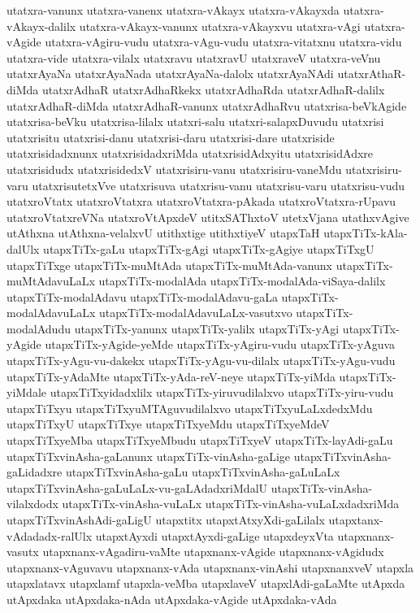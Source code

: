 {utatxra-vanunx
utatxra-vanenx
utatxra-vAkayx
utatxra-vAkayxda
utatxra-vAkayx-dalilx
utatxra-vAkayx-vanunx
utatxra-vAkayxvu
utatxra-vAgi
utatxra-vAgide
utatxra-vAgiru-vudu
utatxra-vAgu-vudu
utatxra-vitatxnu
utatxra-vidu
utatxra-vide
utatxra-vilalx
utatxravu
utatxravU
utatxraveV
utatxra-veVnu
utatxrAyaNa
utatxrAyaNada
utatxrAyaNa-dalolx
utatxrAyaNAdi
utatxrAthaR-diMda
utatxrAdhaR
utatxrAdhaRkekx
utatxrAdhaRda
utatxrAdhaR-dalilx
utatxrAdhaR-diMda
utatxrAdhaR-vanunx
utatxrAdhaRvu
utatxrisa-beVkAgide
utatxrisa-beVku
utatxrisa-lilalx
utatxri-salu
utatxri-salapxDuvudu
utatxrisi
utatxrisitu
utatxrisi-danu
utatxrisi-daru
utatxrisi-dare
utatxriside
utatxrisidadxnunx
utatxrisidadxriMda
utatxrisidAdxyitu
utatxrisidAdxre
utatxrisidudx
utatxrisidedxV
utatxrisiru-vanu
utatxrisiru-vaneMdu
utatxrisiru-varu
utatxrisutetxVve
utatxrisuva
utatxrisu-vanu
utatxrisu-varu
utatxrisu-vudu
utatxroVtatx
utatxroVtatxra
utatxroVtatxra-pAkada
utatxroVtatxra-rUpavu
utatxroVtatxreVNa
utatxroVtApxdeV
utitxSAThxtoV
utetxVjana
utathxvAgive
utAthxna
utAthxna-velalxvU
utithxtige
utithxtiyeV
utapxTaH
utapxTiTx-kAla-dalUlx
utapxTiTx-gaLu
utapxTiTx-gAgi
utapxTiTx-gAgiye
utapxTiTxgU
utapxTiTxge
utapxTiTx-muMtAda
utapxTiTx-muMtAda-vanunx
utapxTiTx-muMtAdavuLaLx
utapxTiTx-modalAda
utapxTiTx-modalAda-viSaya-dalilx
utapxTiTx-modalAdavu
utapxTiTx-modalAdavu-gaLa
utapxTiTx-modalAdavuLaLx
utapxTiTx-modalAdavuLaLx-vasutxvo
utapxTiTx-modalAdudu
utapxTiTx-yanunx
utapxTiTx-yalilx
utapxTiTx-yAgi
utapxTiTx-yAgide
utapxTiTx-yAgide-yeMde
utapxTiTx-yAgiru-vudu
utapxTiTx-yAguva
utapxTiTx-yAgu-vu-dakekx
utapxTiTx-yAgu-vu-dilalx
utapxTiTx-yAgu-vudu
utapxTiTx-yAdaMte
utapxTiTx-yAda-reV-neye
utapxTiTx-yiMda
utapxTiTx-yiMdale
utapxTiTxyidadxlilx
utapxTiTx-yiruvudilalxvo
utapxTiTx-yiru-vudu
utapxTiTxyu
utapxTiTxyuMTAguvudilalxvo
utapxTiTxyuLaLxdedxMdu
utapxTiTxyU
utapxTiTxye
utapxTiTxyeMdu
utapxTiTxyeMdeV
utapxTiTxyeMba
utapxTiTxyeMbudu
utapxTiTxyeV
utapxTiTx-layAdi-gaLu
utapxTiTxvinAsha-gaLanunx
utapxTiTx-vinAsha-gaLige
utapxTiTxvinAsha-gaLidadxre
utapxTiTxvinAsha-gaLu
utapxTiTxvinAsha-gaLuLaLx
utapxTiTxvinAsha-gaLuLaLx-vu-gaLAdadxriMdalU
utapxTiTx-vinAsha-vilalxdodx
utapxTiTx-vinAsha-vuLaLx
utapxTiTx-vinAsha-vuLaLxdadxriMda
utapxTiTxvinAshAdi-gaLigU
utapxtitx
utapxtAtxyXdi-gaLilalx
utapxtanx-vAdadadx-ralUlx
utapxtAyxdi
utapxtAyxdi-gaLige
utapxdeyxVta
utapxnanx-vasutx
utapxnanx-vAgadiru-vaMte
utapxnanx-vAgide
utapxnanx-vAgidudx
utapxnanx-vAguvavu
utapxnanx-vAda
utapxnanx-vinAshi
utapxnanxveV
utapxla
utapxlatavx
utapxlamf
utapxla-veMba
utapxlaveV
utapxlAdi-gaLaMte
utApxda
utApxdaka
utApxdaka-nAda
utApxdaka-vAgide
utApxdaka-vAda
}
